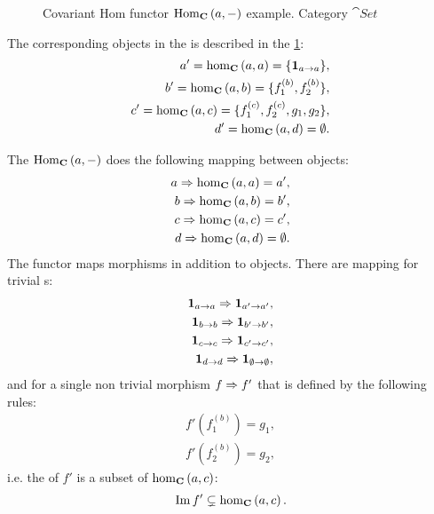 \begin{example}
\begin{figure}
\begin{tikzpicture}[ele/.style={fill=black,circle,minimum
          width=.8pt,inner sep=1pt},every fit/.style={ellipse,draw,inner
          sep=-2pt}]
    \end{tikzpicture}
    \caption{Covariant Hom functor $\catcovhom{C}{a}$ example. Category $\cat{Set}$}
    \label{fig:cov_hom_functor_set}
  \end{figure}

The corresponding
objects in the  is described in the
\cref{fig:cov_hom_functor_set}: 
\begin{eqnarray}
a' = \catmset[C]{a}{a} = \{\idm{a}\},
\nonumber \\
b' = \catmset[C]{a}{b} = \{f_1^{(b)}, f_2^{(b)}\}, 
\nonumber \\
c' = \catmset[C]{a}{c} = \{f_1^{(c)}, f_2^{(c)}, g_1, g_2\}, 
\nonumber \\
d' = \catmset[C]{a}{d} = \emptyset.
\nonumber
\end{eqnarray}

The $\catcovhom{C}{a}$ does the following mapping between objects:
\begin{eqnarray}
a \tof \catmset[C]{a}{a} = a',
\nonumber \\
b \tof \catmset[C]{a}{b} = b', 
\nonumber \\
c \tof \catmset[C]{a}{c} = c', 
\nonumber \\
d \tof \catmset[C]{a}{d} = \emptyset.
\nonumber
\end{eqnarray}
The functor maps morphisms in addition to objects. There are mapping
for trivial s: 
\begin{eqnarray}
\idm{a} \tof \idm{a'},
\nonumber \\
\idm{b} \tof \idm{b'},
\nonumber \\
\idm{c} \tof \idm{c'},
\nonumber \\
\idm{d} \tof \idm{\emptyset},
\nonumber
\end{eqnarray}
and for a single non trivial morphism $f \tof f'$ that is defined by
the following rules:
\begin{eqnarray}
f'(f_1^{(b)}) = g_1,
\nonumber \\
f'(f_2^{(b)}) = g_2,
\nonumber
\end{eqnarray}
i.e. the  of $f'$ is a subset of
$\catmset[C]{a}{c}$:
\[
\Ima{f'} \subsetneq \catmset[C]{a}{c}.
\]
\end{example}


